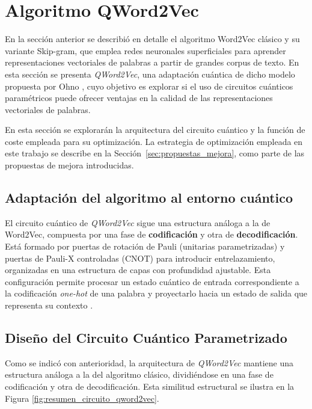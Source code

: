 \section{Algoritmo QWord2Vec}
\label{chap:qword2vec}

En la sección anterior se describió en detalle el algoritmo Word2Vec clásico y su variante Skip-gram, que emplea redes neuronales superficiales para aprender representaciones vectoriales de palabras a partir de grandes corpus de texto. En esta sección se presenta \textit{QWord2Vec}, una adaptación cuántica de dicho modelo propuesta por Ohno \cite{ohno_qword2vec_2025}, cuyo objetivo es explorar si el uso de circuitos cuánticos paramétricos puede ofrecer ventajas en la calidad de las representaciones vectoriales de palabras.

En esta sección se explorarán la arquitectura del circuito cuántico y la función de coste empleada para su optimización. La estrategia de optimización empleada en este trabajo se describe en la Sección~\ref{sec:propuestas_mejora}, como parte de las propuestas de mejora introducidas.

\subsection{Adaptación del algoritmo al entorno cuántico}

El circuito cuántico de \textit{QWord2Vec} sigue una estructura análoga a la de Word2Vec, compuesta por una fase de \textbf{codificación} y otra de \textbf{decodificación}. Está formado por puertas de rotación de Pauli (unitarias parametrizadas) y puertas de Pauli-X controladas (CNOT) para introducir entrelazamiento, organizadas en una estructura de capas con profundidad ajustable. Esta configuración permite procesar un estado cuántico de entrada correspondiente a la codificación \textit{one-hot} de una palabra y proyectarlo hacia un estado de salida que representa su contexto \cite{ohno_qword2vec_2025}.

\subsection{Diseño del Circuito Cuántico Parametrizado}

Como se indicó con anterioridad, la arquitectura de \textit{QWord2Vec} mantiene una estructura análoga a la del algoritmo clásico, dividiéndose en una fase de codificación y otra de decodificación. Esta similitud estructural se ilustra en la Figura \ref{fig:resumen_circuito_qword2vec}.

